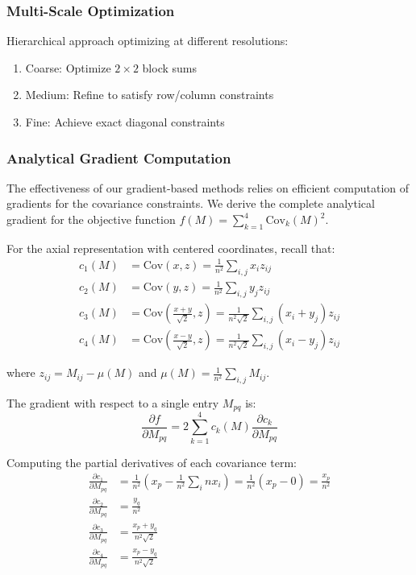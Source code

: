 \subsubsection{Multi-Scale Optimization}
Hierarchical approach optimizing at different resolutions:
\begin{enumerate}
    \item Coarse: Optimize $2 \times 2$ block sums
    \item Medium: Refine to satisfy row/column constraints
    \item Fine: Achieve exact diagonal constraints
\end{enumerate}

\subsubsection{Analytical Gradient Computation}

The effectiveness of our gradient-based methods relies on efficient computation of gradients for the covariance constraints. We derive the complete analytical gradient for the objective function $f(M) = \sum_{k=1}^4 \text{Cov}_k(M)^2$.

For the axial representation with centered coordinates, recall that:
\begin{align}
c_1(M) &= \text{Cov}(x, z) = \frac{1}{n^2}\sum_{i,j} x_i z_{ij} \\
c_2(M) &= \text{Cov}(y, z) = \frac{1}{n^2}\sum_{i,j} y_j z_{ij} \\
c_3(M) &= \text{Cov}\left(\frac{x+y}{\sqrt{2}}, z\right) = \frac{1}{n^2\sqrt{2}}\sum_{i,j} (x_i + y_j) z_{ij} \\
c_4(M) &= \text{Cov}\left(\frac{x-y}{\sqrt{2}}, z\right) = \frac{1}{n^2\sqrt{2}}\sum_{i,j} (x_i - y_j) z_{ij}
\end{align}

where $z_{ij} = M_{ij} - \mu(M)$ and $\mu(M) = \frac{1}{n^2}\sum_{i,j} M_{ij}$.

The gradient with respect to a single entry $M_{pq}$ is:
\begin{equation}
\frac{\partial f}{\partial M_{pq}} = 2\sum_{k=1}^4 c_k(M) \frac{\partial c_k}{\partial M_{pq}}
\end{equation}

Computing the partial derivatives of each covariance term:
\begin{align}
\frac{\partial c_1}{\partial M_{pq}} &= \frac{1}{n^2}\left(x_p - \frac{1}{n^2}\sum_{i} n x_i\right) = \frac{1}{n^2}\left(x_p - 0\right) = \frac{x_p}{n^2} \\
\frac{\partial c_2}{\partial M_{pq}} &= \frac{y_q}{n^2} \\
\frac{\partial c_3}{\partial M_{pq}} &= \frac{x_p + y_q}{n^2\sqrt{2}} \\
\frac{\partial c_4}{\partial M_{pq}} &= \frac{x_p - y_q}{n^2\sqrt{2}}
\end{align}

